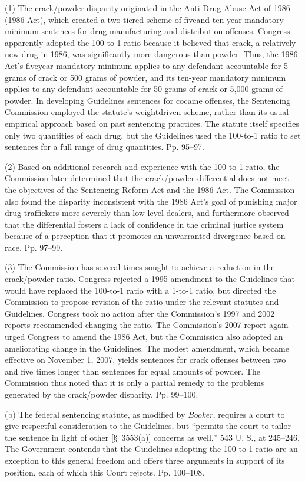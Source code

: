   (1) The crack/powder disparity originated in the Anti-Drug Abuse
Act of 1986 (1986 Act), which created a two-tiered scheme of fiveand
ten-year mandatory minimum sentences for drug manufacturing and
distribution offenses. Congress apparently adopted the 100-to-1 ratio
because it believed that crack, a relatively new drug in 1986, was
significantly more dangerous than powder. Thus, the 1986 Act's
fiveyear mandatory minimum applies to any defendant accountable for
5 grams of crack or 500 grams of powder, and its ten-year mandatory
minimum applies to any defendant accountable for 50 grams of crack
or 5,000 grams of powder. In developing Guidelines sentences for
cocaine offenses, the Sentencing Commission employed the statute's
weightdriven scheme, rather than its usual empirical approach based
on past sentencing practices. The statute itself specifies only two
quantities of each drug, but the Guidelines used the 100-to-1 ratio to
set sentences for a full range of drug quantities. Pp. 95--97.

  (2) Based on additional research and experience with the 100-to-1
ratio, the Commission later determined that the crack/powder
differential does not meet the objectives of the Sentencing Reform Act
and the 1986 Act. The Commission also found the disparity inconsistent
with the 1986 Act's goal of punishing major drug traffickers more
severely than low-level dealers, and furthermore observed that the
differential fosters a lack of confidence in the criminal justice system
because of a perception that it promotes an unwarranted divergence based
on race. Pp. 97--99.

  (3) The Commission has several times sought to achieve a reduction
in the crack/powder ratio. Congress rejected a 1995 amendment to the
Guidelines that would have replaced the 100-to-1 ratio with a 1-to-1
ratio, but directed the Commission to propose revision of the ratio
under the relevant statutes and Guidelines. Congress took no action
after the Commission's 1997 and 2002 reports recommended changing the
ratio. The Commission's 2007 report again urged Congress to amend the
1986 Act, but the Commission also adopted an ameliorating change in the
Guidelines. The modest amendment, which became effective on November 1,
2007, yields sentences for crack offenses between two and five times
longer than sentences for equal amounts of powder. The Commission thus
noted that it is only a partial remedy to the problems generated by the
crack/powder disparity. Pp. 99--100.\newpage 

  (b) The federal sentencing statute, as modified by \emph{Booker,}
requires a court to give respectful consideration to the Guidelines,
but ``permits the court to tailor the sentence in light of other
[\S~3553(a)] concerns as well,'' 543 U. S., at 245--246. The
Government contends that the Guidelines adopting the 100-to-1 ratio
are an exception to this general freedom and offers three arguments
in support of its position, each of which this Court rejects. Pp.
100--108.

